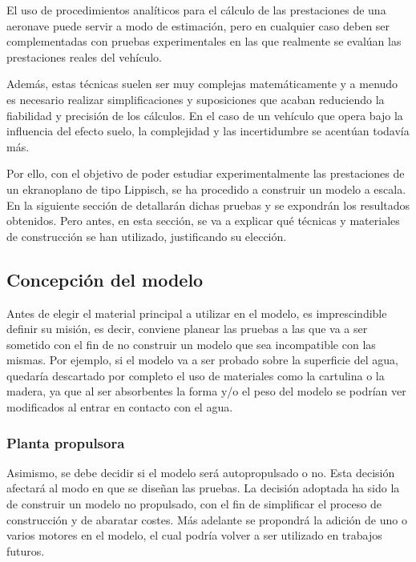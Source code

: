 El uso de procedimientos analíticos para el cálculo de las prestaciones de una aeronave puede servir a modo de estimación, pero en cualquier caso deben ser complementadas con pruebas experimentales en las que realmente se evalúan las prestaciones reales del vehículo.

Además, estas técnicas suelen ser muy complejas matemáticamente y a menudo es necesario realizar simplificaciones y suposiciones que acaban reduciendo la fiabilidad y precisión de los cálculos. En el caso de un vehículo que opera bajo la influencia del efecto suelo, la complejidad y las incertidumbre se acentúan todavía más.

Por ello, con el objetivo de poder estudiar experimentalmente las prestaciones de un ekranoplano de tipo Lippisch, se ha procedido a construir un modelo a escala. En la siguiente sección de detallarán dichas pruebas y se expondrán los resultados obtenidos. Pero antes, en esta sección, se va a explicar qué técnicas y materiales de construcción se han utilizado, justificando su elección.


\subsection{Concepción del modelo}
\label{sec:building:conception}

Antes de elegir el material principal a utilizar en el modelo, es imprescindible definir su misión, es decir, conviene planear las pruebas a las que va a ser sometido con el fin de no construir un modelo que sea incompatible con las mismas. Por ejemplo, si el modelo va a ser probado sobre la superficie del agua, quedaría descartado por completo el uso de materiales como la cartulina o la madera, ya que al ser absorbentes la forma y/o el peso del modelo se podrían ver modificados al entrar en contacto con el agua.

\subsubsection{Planta propulsora}
\label{sec:building:conception:propulsion}

Asimismo, se debe decidir si el modelo será autopropulsado o no. Esta decisión afectará al modo en que se diseñan las pruebas. La decisión adoptada ha sido la de construir un modelo no propulsado, con el fin de simplificar el proceso de construcción y de abaratar costes. Más adelante se propondrá la adición de uno o varios motores en el modelo, el cual podría volver a ser utilizado en trabajos futuros.

